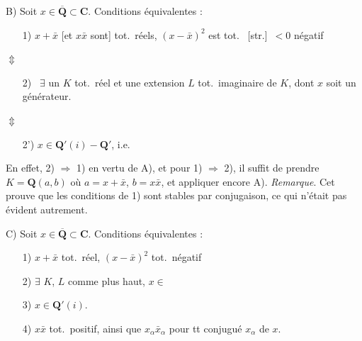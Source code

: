 \documentclass[11pt,a4paper]{article}
\begin{document}
B) Soit $x \in \overline{\mathbf{Q}} \subset \mathbf{C}$. Conditions
équivalentes :
\begin{enumerate}
  \item[1)] $x + \bar{x}$ [et $x\bar{x}$ sont] tot.\ réels, $(x - \bar{x})^{2}$
  est tot.\  [str.]\ $< 0$ négatif
\end{enumerate}
\marginal{[\uncertain{conséquence} des autres, car
$x\bar{x} = \frac{1}{4}\bigl((x + \bar{x})^{2} - (x - \bar{x})^{2}\bigr)$]}

$\Updownarrow$
\begin{enumerate}
  \item[2)] \ $\exists$ un $K$ tot.\ réel et une
  extension $L$ tot.\ imaginaire de $K$, dont $x$ soit un générateur.
\end{enumerate}

$\Updownarrow$
\begin{enumerate}
  \item[2')] $x \in \mathbf{Q}'(i) - \mathbf{Q}'$, i.e.\ \ill{}
\end{enumerate}

En effet, 2) $\Rightarrow$ 1) en vertu de A), et pour 1) $\Rightarrow$ 2),
il suffit de prendre $K = \mathbf{Q}(a, b)$ où $a = x + \bar{x}$,
$b = x\bar{x}$, et appliquer encore A). \emph{Remarque}. Cet
 prouve que les conditions de 1) sont stables par
conjugaison, ce qui n'était pas évident autrement.


C) Soit $x \in \overline{\mathbf{Q}} \subset \mathbf{C}$. Conditions
équivalentes :
\begin{enumerate}
  \item[1)] $x + \bar{x}$ tot.\ réel, $(x - \bar{x})^{2}$ tot.\ négatif
  \item[2)] $\exists$ $K$, $L$ comme plus haut, $x \in$ 
  \item[3)] $x \in \mathbf{Q}'(i)$.
  \item[4)] $x\bar{x}$ tot.\ positif,  ainsi que
  $x_{\alpha}\bar{x}_{\alpha}$ pour tt conjugué $x_{\alpha}$ de $x$.
\end{enumerate}
\end{document}
